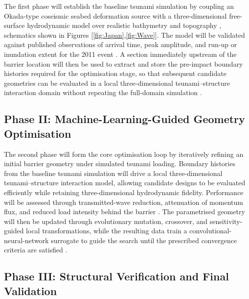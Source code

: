 \documentclass[11pt]{article}
\numberwithin{equation}{section}
\let\cite=\supercite%
\begin{document}
The first phase will establish the baseline tsunami simulation by coupling an Okada-type coseismic seabed deformation source with a three-dimensional free-surface hydrodynamic model over realistic bathymetry and topography \cite{Okada1985}, schematics shown in Figures [\ref{fig:Japan},\ref{fig:Wave}]. The model will be validated against published observations of arrival time, peak amplitude, and run-up or inundation extent for the 2011 event \cite{NCEITohokuEvent,Goto2012}. A section immediately upstream of the barrier location will then be used to extract and store the pre-impact boundary histories required for the optimisation stage, so that subsequent candidate geometries can be evaluated in a local three-dimensional tsunami--structure interaction domain without repeating the full-domain simulation \cite{Fujima2002,Takase2016,Tozato2022}.

\vspace{-4mm}
\subsection{Phase II: Machine-Learning-Guided Geometry Optimisation}\label{sec:phase_ii_machine_learning_guided_geometry_optimisation}
\vspace{-3mm}

The second phase will form the core optimisation loop by iteratively refining an initial barrier geometry under simulated tsunami loading. Boundary histories from the baseline tsunami simulation will drive a local three-dimensional tsunami--structure interaction model, allowing candidate designs to be evaluated efficiently while retaining three-dimensional hydrodynamic fidelity. Performance will be assessed through transmitted-wave reduction, attenuation of momentum flux, and reduced load intensity behind the barrier \cite{Dentale2014,Fujima2002,Takase2016,Tozato2022}. The parametrised geometry will then be updated through evolutionary mutation, crossover, and sensitivity-guided local transformations, while the resulting data train a convolutional-neural-network surrogate to guide the search until the prescribed convergence criteria are satisfied \cite{Starodubcev2022,Sidorenko2024}.

\vspace{-4mm}
\subsection{Phase III: Structural Verification and Final Validation}\label{sec:phase_iii_structural_verification_and_final_validation}
\vspace{-3mm}
\end{document}
